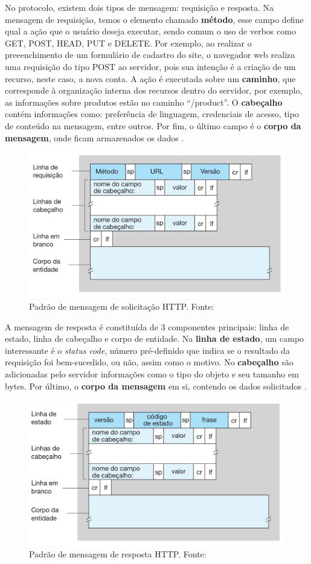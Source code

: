 No protocolo, existem dois tipos de mensagem: requisição e resposta. Na mensagem de requisição, temos o elemento
chamado \textbf{método}, esse campo define qual a ação que o usuário deseja executar, sendo comum o uso de verbos
como GET, POST, HEAD, PUT e DELETE. Por exemplo, ao realizar o preeenchimento de um formulário de cadastro do site, o
navegador web realiza uma requisição do tipo POST ao servidor, pois sua intenção é a criação de um recurso,
neste caso, a nova conta. A ação é executada sobre um \textbf{caminho}, que corresponde à organização interna dos recursos 
dentro do servidor, por exemplo, as informações sobre produtos estão no caminho ``/product''. O \textbf{cabeçalho} contém informações como: preferência de linguagem,
credenciais de acesso, tipo de conteúdo na mensagem, entre outros. Por fim, o último campo é o \textbf{corpo da mensagem}, 
onde ficam armazenados os dados \cite[pp. 77]{redes-kurose2010}.

\begin{figure}[ht]
    \centering
    \includegraphics[width=.55\textwidth]{img/mensagem-http-solicitação.png}
    \caption{Padrão de mensagem de solicitação HTTP. Fonte:\cite{redes-kurose2010}}\label{figMessageRequest}
\end{figure}

A mensagem de resposta é constituída de 3 componentes principais: linha de estado, linha de cabeçalho e corpo de entidade. Na \textbf{linha de estado}, um campo
interessante é o \textit{status code}, número pré-definido que indica se o resultado da requisição foi bem-sucedido, ou não, assim como o motivo. No \textbf{cabeçalho}
são adicionadas pelo servidor informações como o tipo do objeto e seu tamanho em bytes. Por último, o \textbf{corpo da mensagem} em si, contendo os dados solicitados \cite[pp. 78]{redes-kurose2010}.

\begin{figure}[ht]
    \centering
    \includegraphics[width=.55\textwidth]{img/mensagem-http-resposta.png}
    \caption{Padrão de mensagem de resposta HTTP. Fonte:\cite{redes-kurose2010}}\label{figMessageResponse}
\end{figure}

